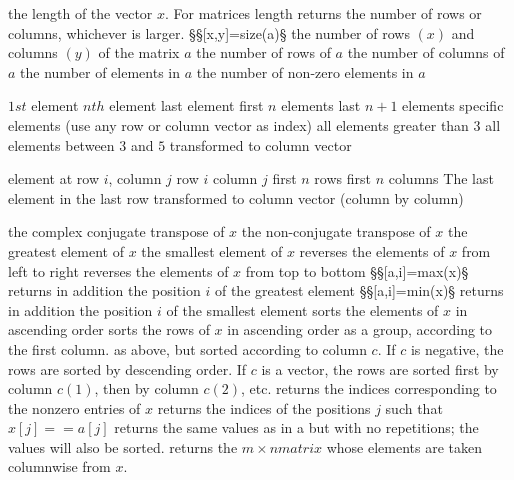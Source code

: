 	{the length of the vector $x$. For matrices length returns the number of rows or columns, whichever is larger.}
§§[x,y]=size(a)§ the number of rows $(x)$ and columns $(y)$ of the matrix $a$
	{the number of rows of $a$}
	{the number of columns of $a$}
	{the number of elements in $a$}
	{the number of non-zero elements in $a$}

	{$1st$ element}
	{$nth$ element}
	{last element}
	{first $n$ elements}
	{last $n+1$ elements}
	{specific elements (use any row or column vector as index)}
	{all elements greater than $3$}
	{all elements between $3$ and $5$}
	{transformed to column vector}

	{element at row $i$, column $j$}
	{row $i$}
	{column $j$}
	{first $n$ rows}
	{first $n$ columns}
	{The last element in the last row}
	{transformed to column vector (column by column)}

	{the complex conjugate transpose of $x$}
	{the non-conjugate transpose of $x$}
	{the greatest element of $x$}
	{the smallest element of $x$}
	{reverses the elements of $x$ from left to right}
	{reverses the elements of $x$ from top to bottom}
§§[a,i]=max(x)§ returns in addition the position $i$ of the greatest element
§§[a,i]=min(x)§ returns in addition the position $i$ of the smallest element
	{sorts the elements of $x$ in ascending order}
	{sorts the rows of $x$ in ascending order as a group, according to the first column.}
	{as above, but sorted according to column $c$. If $c$ is negative, the rows are sorted by descending order. If $c$ is a vector, the rows are sorted first by column $c(1)$, then by column $c(2)$, etc.}
	{returns the indices corresponding to the nonzero entries of $x$}
	{returns the indices of the positions $j$ such that $x[j]==a[j]$}
	{returns the same values as in a but with no repetitions; the values will also be sorted.}
	{returns the $m  \times  n matrix$ whose elements are taken columnwise from $x$.}

